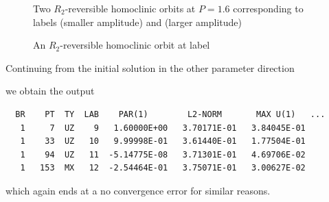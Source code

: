 \documentclass[12pt]{report}
\begin{document}
\begin{figure}[p]
\epsfysize 9.0cm
\centerline{}
\caption{Two $R_2$-reversible homoclinic orbits at $P=1.6$ 
corresponding to labels  (smaller amplitude) and  (larger amplitude)}
\label{Frev3}
\end{figure}
\begin{figure}[p]
\epsfysize 9.0cm
\centerline{}
\caption{An $R_2$-reversible homoclinic orbit at label }
\label{Frev4}
\end{figure}

Continuing from the initial solution in the other parameter direction
\begin{center}
\end{center}
we obtain the output
\begin{verbatim}
  BR    PT  TY  LAB    PAR(1)        L2-NORM       MAX U(1)   ...
   1     7  UZ    9   1.60000E+00   3.70171E-01   3.84045E-01
   1    33  UZ   10   9.99998E-01   3.61440E-01   1.77504E-01
   1    94  UZ   11  -5.14775E-08   3.71301E-01   4.69706E-02
   1   153  MX   12  -2.54464E-01   3.75071E-01   3.00627E-02
\end{verbatim}
which again ends at a no convergence error for similar reasons.
\end{document}
